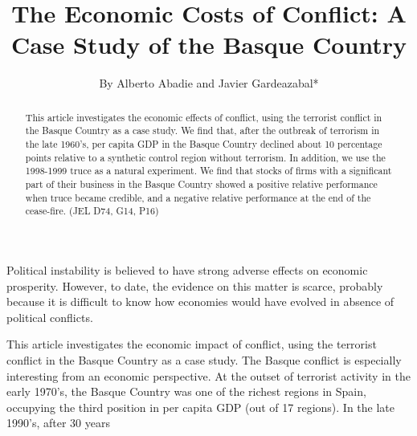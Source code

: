 \documentclass[10pt]{article}
\title{The Economic Costs of Conflict: A Case Study of the Basque Country }
\author{By Alberto Abadie and Javier Gardeazabal*}
\date{}
\begin{document}
\maketitle
\captionsetup{singlelinecheck=false}


\begin{abstract}
This article investigates the economic effects of conflict, using the terrorist conflict in the Basque Country as a case study. We find that, after the outbreak of terrorism in the late 1960's, per capita GDP in the Basque Country declined about 10 percentage points relative to a synthetic control region without terrorism. In addition, we use the 1998-1999 truce as a natural experiment. We find that stocks of firms with a significant part of their business in the Basque Country showed a positive relative performance when truce became credible, and a negative relative performance at the end of the cease-fire. (JEL D74, G14, P16)
\end{abstract}

Political instability is believed to have strong adverse effects on economic prosperity. However, to date, the evidence on this matter is scarce, probably because it is difficult to know how economies would have evolved in absence of political conflicts.

This article investigates the economic impact of conflict, using the terrorist conflict in the Basque Country as a case study. The Basque conflict is especially interesting from an economic perspective. At the outset of terrorist activity in the early 1970's, the Basque Country was one of the richest regions in Spain, occupying the third position in per capita GDP (out of 17 regions). In the late 1990's, after 30 years
\end{document}
